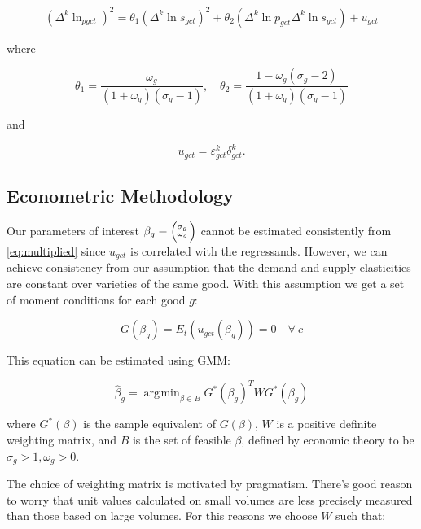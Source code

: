 \documentclass[12pt,a4paper]{article}                      %
\DeclareMathOperator*{\argmin}{arg\!\min}
\begin{document}
\begin{equation}
    (\Delta^k \ln_{pgct})^2 = \theta_1 (\Delta^k \ln s_{gct})^2 + \theta_2 (\Delta^k \ln{p_{gct}} \Delta^k\ln{s_{gct}}) + u_{gct}
\end{equation}

where

\begin{equation}\label{eq:multiplied}
    \theta_1 = \frac{\omega_g}{(1 + \omega_g) (\sigma_g - 1)}, \quad \theta_2 = \frac{1 - \omega_g(\sigma_g - 2)}{(1 + \omega_g)(\sigma_g - 1)}
\end{equation}

and

\begin{equation}
    u_{gct} = \varepsilon^k_{gct} \delta^k_{gct}.
\end{equation}

\subsection{Econometric Methodology}
\label{sub:econometric_methodology}


Our parameters of interest $\beta_g \equiv \Bigl(\negthinspace\begin{smallmatrix}\sigma_g\\\omega_g\end{smallmatrix}\Bigr)$ cannot be estimated consistently from \ref{eq:multiplied} since $u_{gct}$ is correlated with the regressands.  However, we can achieve consistency from our assumption that the demand and supply elasticities are constant over varieties of the same good.  With this assumption we get a set of moment conditions for each good $g$:

\begin{equation}
    G(\beta_g) = E_t(u_{gct}(\beta_g)) = 0 \quad \forall \ c
\end{equation}

This equation can be estimated using GMM:

\begin{equation}
    \hat{\beta}_g = \argmin_{\beta \in B} G^*(\beta_g)^{T} W G^*(\beta_g)
\end{equation}

where $G^*(\beta)$ is the sample equivalent of $G(\beta)$, $W$ is a positive definite weighting matrix, and $B$ is the set of feasible $\beta$, defined by economic theory to be $\sigma_g > 1, \omega_g > 0$.

The choice of weighting matrix is motivated by pragmatism.  There's good reason to worry that unit values calculated on small volumes are less precisely measured than those based on large volumes.  For this reasons we choose $W$ such that:
\end{document}
